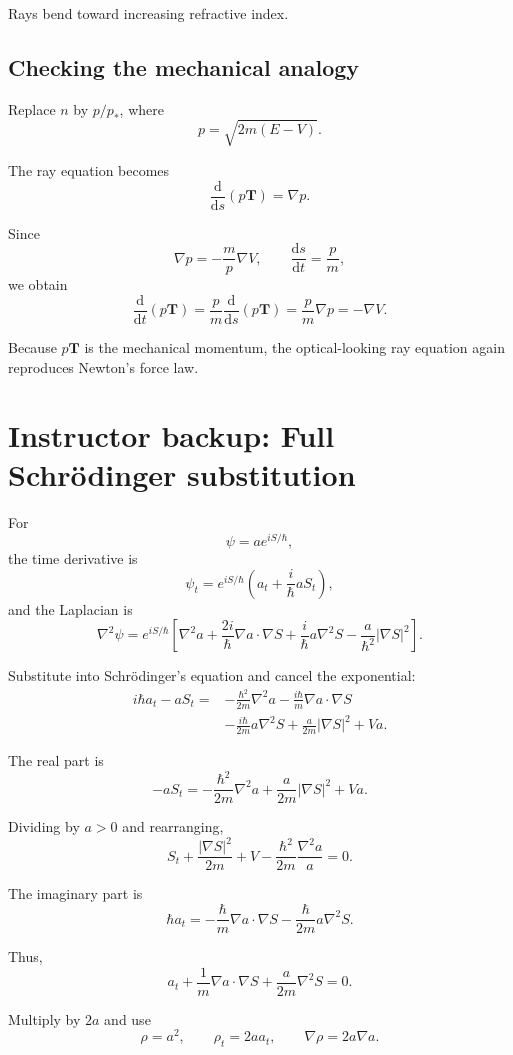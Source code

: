 \documentclass[11pt,a4paper]{article}
\newcommand{\dd}{\mathrm{d}}
\newcommand{\vT}{\mathbf{T}}
\begin{document}
Rays bend toward increasing refractive index.

\subsection*{Checking the mechanical analogy}

Replace \(n\) by \(p/p_*\), where
\[
p=\sqrt{2m(E-V)}.
\]

The ray equation becomes
\[
\frac{\dd}{\dd s}(p\vT)=\nabla p.
\]

Since
\[
\nabla p
=
-\frac m p\nabla V,
\qquad
\frac{\dd s}{\dd t}
=
\frac p m,
\]
we obtain
\[
\frac{\dd}{\dd t}(p\vT)
=
\frac p m
\frac{\dd}{\dd s}(p\vT)
=
\frac p m\nabla p
=
-\nabla V.
\]

Because \(p\vT\) is the mechanical momentum,
the optical-looking ray equation again reproduces
Newton's force law.

\section*{Instructor backup: Full Schr\"odinger substitution}

For
\[
\psi=a e^{iS/\hbar},
\]
the time derivative is
\[
\psi_t
=
e^{iS/\hbar}
\left(
a_t+\frac i\hbar aS_t
\right),
\]
and the Laplacian is
\[
\nabla^2\psi
=
e^{iS/\hbar}
\left[
\nabla^2a
+
\frac{2i}{\hbar}\nabla a\cdot\nabla S
+
\frac i\hbar a\nabla^2S
-
\frac a{\hbar^2}|\nabla S|^2
\right].
\]

Substitute into Schr\"odinger's equation and cancel
the exponential:
\begin{align*}
i\hbar a_t-aS_t
={}&
-\frac{\hbar^2}{2m}\nabla^2a
-
\frac{i\hbar}{m}\nabla a\cdot\nabla S\\
&-
\frac{i\hbar}{2m}a\nabla^2S
+
\frac a{2m}|\nabla S|^2
+
Va.
\end{align*}

The real part is
\[
-aS_t
=
-\frac{\hbar^2}{2m}\nabla^2a
+
\frac a{2m}|\nabla S|^2
+
Va.
\]

Dividing by \(a>0\) and rearranging,
\[
\boxed{
S_t
+
\frac{|\nabla S|^2}{2m}
+
V
-
\frac{\hbar^2}{2m}\frac{\nabla^2a}{a}
=
0.
}
\]

The imaginary part is
\[
\hbar a_t
=
-\frac{\hbar}{m}\nabla a\cdot\nabla S
-
\frac{\hbar}{2m}a\nabla^2S.
\]

Thus,
\[
a_t
+
\frac1m\nabla a\cdot\nabla S
+
\frac a{2m}\nabla^2S
=
0.
\]

Multiply by \(2a\) and use
\[
\rho=a^2,
\qquad
\rho_t=2aa_t,
\qquad
\nabla\rho=2a\nabla a.
\]
\end{document}
